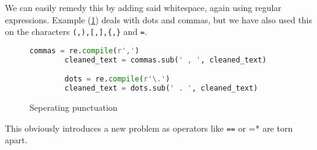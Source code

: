     We can easily remedy this by adding said whitespace, again using
    regular expressions.  Example (\ref{fig:puncts}) deals with
    dots and commas, but we have also used this on the characters
    \verb+(,),[,],{,}+ and \verb+=+.

    \begin{figure}[htpb]
      \centering \begin{lstlisting}[language=Python]
        commas = re.compile(r',')
        cleaned_text = commas.sub(' , ', cleaned_text)

        dots = re.compile(r'\.') 
        cleaned_text = dots.sub(' . ', cleaned_text)
      \end{lstlisting} \caption{Seperating punctuation} \label{fig:puncts}
    \end{figure}

    This obviously introduces a new problem as operators like \verb+==+
    or \verb++=* are torn apart.
